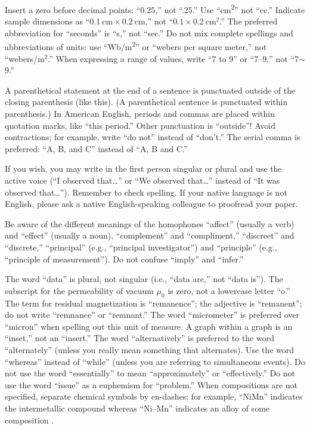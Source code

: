 \documentclass[conf]{new-aiaa}
\begin{document}
Insert a zero before decimal points: ``0.25,'' not ``.25.'' Use ``\si{\centi\meter\squared}'' not ``cc.'' Indicate sample dimensions as ``$\SI{0.1}{\centi\meter} \times \SI{0.2}{\centi\meter}$,'' not ``$0.1 \times \SI{0.2}{\centi\meter\squared}$.'' The preferred abbreviation for ``seconds'' is ``s,'' not ``sec.'' Do not mix complete spellings and abbreviations of units: use ``\si[per-mode=symbol]{\weber\per\meter\squared}'' or ``webers per square meter,'' not ``webers/m$^2$.'' When expressing a range of values, write ``7 to 9'' or ``7--9,'' not ``7$\sim$9.''

A parenthetical statement at the end of a sentence is punctuated outside of the closing parenthesis (like this). (A parenthetical sentence is punctuated within parenthesis.) In American English, periods and commas are placed within quotation marks, like ``this period.'' Other punctuation is ``outside''! Avoid contractions; for example, write ``do not'' instead of ``don’t.'' The serial comma is preferred: ``A, B, and C'' instead of ``A, B and C.''

If you wish, you may write in the first person singular or plural and use the active voice (``I observed that\ldots'' or ``We observed that\ldots'' instead of ``It was observed that\ldots''). Remember to check spelling. If your native language is not English, please ask a native English-speaking colleague to proofread your paper.

Be aware of the different meanings of the homophones ``affect'' (usually a verb) and ``effect'' (usually a noun), ``complement'' and ``compliment,'' ``discreet'' and ``discrete,'' ``principal'' (e.g., ``principal investigator'') and ``principle'' (e.g., ``principle of measurement''). Do not confuse ``imply'' and ``infer.''

The word ``data'' is plural, not singular (i.e., ``data are,'' not ``data is''). The subscript for the permeability of vacuum $\mu_0$ is zero, not a lowercase letter ``o.'' The term for residual magnetization is ``remanence''; the adjective is ``remanent''; do not write ``remnance'' or ``remnant.'' The word ``micrometer'' is preferred over ``micron'' when spelling out this unit of measure. A graph within a graph is an ``inset,'' not an ``insert.'' The word ``alternatively'' is preferred to the word ``alternately'' (unless you really mean something that alternates). Use the word ``whereas'' instead of ``while'' (unless you are referring to simultaneous events). Do not use the word ``essentially'' to mean ``approximately'' or ``effectively.'' Do not use the word ``issue'' as a euphemism for ``problem.'' When compositions are not specified, separate chemical symbols by en-dashes; for example, ``NiMn'' indicates the intermetallic compound  whereas ``Ni--Mn'' indicates an alloy of some composition .
\end{document}
